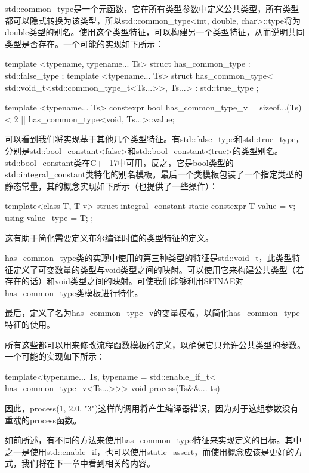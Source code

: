 std::common\_type是一个元函数，它在所有类型参数中定义公共类型，所有类型都可以隐式转换为该类型，所以std::common\_type<int, double, char>::type将为double类型的别名。使用这个类型特征，可以构建另一个类型特征，从而说明共同类型是否存在。一个可能的实现如下所示：

\begin{cpp}
template <typename, typename... Ts>
struct has_common_type : std::false_type {};
template <typename... Ts>
struct has_common_type<
		std::void_t<std::common_type_t<Ts...>>,
		Ts...>
	: std::true_type {};
	
template <typename... Ts>
constexpr bool has_common_type_v =
	sizeof...(Ts) < 2 ||
	has_common_type<void, Ts...>::value;
\end{cpp}

可以看到我们将实现基于其他几个类型特征。有std::false\_type和std::true\_type，分别是std::bool\_constant<false>和std::bool\_constant<true>的类型别名。std::bool\_constant类在C++17中可用，反之，它是bool类型的std::integral\_constant类特化的别名模板。最后一个类模板包装了一个指定类型的静态常量，其的概念实现如下所示（也提供了一些操作）：

\begin{cpp}
template<class T, T v>
struct integral_constant
{
	static constexpr T value = v;
	using value_type = T;
};
\end{cpp}

这有助于简化需要定义布尔编译时值的类型特征的定义。

has\_common\_type类的实现中使用的第三种类型的特征是std::void\_t，此类型特征定义了可变数量的类型与void类型之间的映射。可以使用它来构建公共类型（若存在的话）和void类型之间的映射。可使我们能够利用SFINAE对has\_common\_type类模板进行特化。

最后，定义了名为has\_common\_type\_v的变量模板，以简化has\_common\_type特征的使用。

所有这些都可以用来修改流程函数模板的定义，以确保它只允许公共类型的参数。一个可能的实现如下所示：

\begin{cpp}
template<typename... Ts,
		 typename = std::enable_if_t<
						has_common_type_v<Ts...>>>
void process(Ts&&... ts)
{ }
\end{cpp}

因此，process(1, 2.0, "3")这样的调用将产生编译器错误，因为对于这组参数没有重载的process函数。

如前所述，有不同的方法来使用has\_common\_type特征来实现定义的目标。其中之一是使用std::enable\_if，也可以使用static\_assert，而使用概念应该是更好的方式，我们将在下一章中看到相关的内容。








